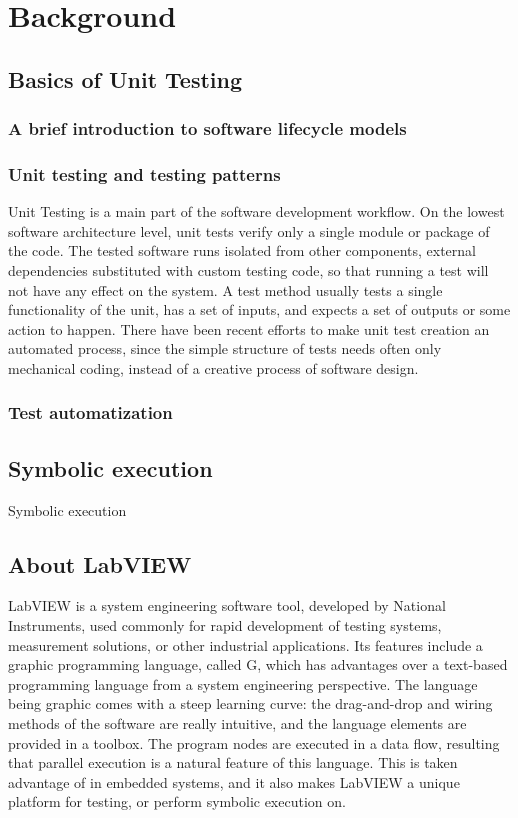 \chapter{Background}
\section{Basics of Unit Testing}
\subsection{A brief introduction to software lifecycle models}
\subsection{Unit testing and testing patterns}
Unit Testing is a main part of the software development workflow. On the lowest software architecture level, unit tests verify only a single module or package of the code. The tested software runs isolated from other components, external dependencies substituted with custom testing code, so that running a test will not have any effect on the system. A test method usually tests a single functionality of the unit, has a set of inputs, and expects a set of outputs or some action to happen. There have been recent efforts to make unit test creation an automated process, since the simple structure of tests needs often only mechanical coding, instead of a creative process of software design. 
\subsection{Test automatization}
\section{Symbolic execution}

Symbolic execution \cite{King:1976:SEP:360248.360252}
\section{About LabVIEW}
LabVIEW is a system engineering software tool, developed by National Instruments, used commonly for rapid development of testing systems, measurement solutions, or other industrial applications. Its features include a graphic programming language, called G, which has advantages over a text-based programming language from a system engineering perspective. The language being graphic comes with a steep learning curve: the drag-and-drop and wiring methods of the software are really intuitive, and the language elements are provided in a toolbox. The program nodes are executed in a data flow, resulting that parallel execution is a natural feature of this language. This is taken advantage of in embedded systems, and it also makes LabVIEW a unique platform for testing, or perform symbolic execution on.
